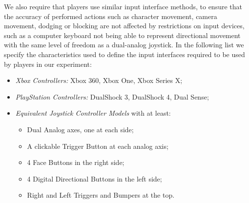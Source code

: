 We also require that players use similar input interface methods, to ensure that the accuracy of performed actions such as character movement, camera movement, dodging or blocking are not affected by restrictions on input devices, such as a computer keyboard not being able to represent directional movement with the same level of freedom as a dual-analog joystick. In the following list we specify the characteristics used to define the input interfaces required to be used by players in our experiment:  
\begin{itemize}
    \item{\emph{Xbox Controllers:} Xbox 360, Xbox One, Xbox Series X;}
    \item{\emph{PlayStation Controllers:} DualShock 3, DualShock 4, Dual Sense;}
    \item{\emph{Equivalent Joystick Controller Models} with at least:}
    \begin{itemize}
        \item{Dual Analog axes, one at each side;}
        \item{A clickable Trigger Button at each analog axis;}
        \item{4 Face Buttons in the right side;}
        \item{4 Digital Directional Buttons in the left side;}
        \item{Right and Left Triggers and Bumpers at the top.}
    \end{itemize}
\end{itemize}

